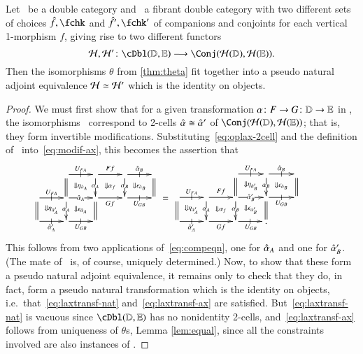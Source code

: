 \documentclass{amsart}
\begin{document}
\begin{lem}\label{thm:h-locfr-uniq}
  Let \lD\ be a double category and \lE\ a fibrant double category
  with two different sets of choices $\fhat,\fchk$ and $\fhat',\fchk'$
  of companions and conjoints for each vertical 1-morphism $f$, giving
  rise to two different functors
  \[\cH,\cH'\maps \cDbl(\lD,\lE)\too \Conj(\cH(\lD),\cH(\lE)).\]
  Then the isomorphisms $\theta$ from \autoref{thm:theta} fit together
  into a pseudo natural adjoint equivalence $\mathcal{H}\simeq \mathcal{H}'$ which is the
  identity on objects.
\end{lem}
\begin{proof}
  We must first show that for a given transformation $\alpha\colon F\to
  G\colon \mathbb{D}\to\mathbb{E}$ in \cDbl, the isomorphisms \th\ correspond to 2-cells $\hat{\alpha} \cong \hat{\alpha}'$ of $\Conj(\cH(\lD),\cH(\lE))$; that is, they form invertible
  modifications.
  Substituting~\eqref{eq:oplax-2cell} and the definition of \th\
  into~\eqref{eq:modif-ax}, this becomes the assertion that
  \begin{equation}
    \vcenter{\xymatrix@R=1.5pc@C=2pc{
        &
        \ar[r]|-@{|}^{U_{FA}}\ar@{=}[d] \ar@{}[dr]|{\Downarrow \eta_{\hat{\alpha}_A}} &
        \ar[r]^{Ff}\ar[d]|{\al_A} \ar@{}[dr]|{\Downarrow \al_f} &
        \ar[r]|-@{|}^{\alhat_B}\ar[d]|{\al_B} \ar@{}[dr]|{\Downarrow \epsilon_{\hat{\alpha}_B}} &
        \ar@{=}[d]\\
        \ar[r]|-@{|}^{U_{FA}} \ar@{=}[d] \ar@{}[dr]|{\Downarrow \eta_{\hat{\alpha}_A'}} &
        \ar[r]|{\alhat_A} \ar[d]|{\al_A} \ar@{}[dr]|{\Downarrow \epsilon_{\hat{\alpha}_A}}&
        \ar[r]_{Gf}  \ar@{=}[d] &
        \ar[r]|-@{|}_{U_{GB}} & \\
        \ar[r]|-@{|}_{\alhat_A'} & \ar[r]|-@{|}_{U_{GB}}&&
      }} \;=\;
    \vcenter{\xymatrix@R=1.5pc@C=2pc{
        && \ar@{=}[d] \ar[r]|-@{|}^{U_{FA}} \ar@{}[dr]|{\Downarrow \eta_{\hat{\alpha}_B'}} &
        \ar[d]|{\al_B} \ar[r]|-@{|}^{\alhat_B} \ar@{}[dr]|{\Downarrow \epsilon_{\hat{\alpha}_B}}
        &
        \ar@{=}[d] &\\
        \ar[r]|-@{|}^{U_{FA}}\ar@{=}[d] \ar@{}[dr]|{\Downarrow \eta_{\hat{\alpha}_A'}} &
        \ar[r]^{Ff}\ar[d]|{\al_A} \ar@{}[dr]|{\Downarrow \al_f} &
        \ar[r]|{\alhat_B'}\ar[d]|{\al_B} \ar@{}[dr]|{\Downarrow \epsilon_{\hat{\alpha}_B'}} &
        \ar@{=}[d] \ar[r]|-@{|}_{U_{GB}}&\\
        \ar[r]|-@{|}_{\alhat_A'} &
        \ar[r]_{Gf} &
        \ar[r]|-@{|}_{U_{GB}} & .
      }}
  \end{equation}
  This follows from two applications of~\eqref{eq:compeqn}, one for
  $\hat{\alpha}_A$ and one for $\hat{\alpha}_B'$.  (The mate of \th\ is, of
  course, uniquely determined.)  Now, to show that these form a pseudo
  natural adjoint equivalence, it remains only to check that they do,
  in fact, form a pseudo natural transformation which is the identity
  on objects, i.e.\ that~\eqref{eq:laxtransf-nat}
  and~\eqref{eq:laxtransf-ax} are satisfied.
  But~\eqref{eq:laxtransf-nat} is vacuous since $\cDbl(\lD,\lE)$ has
  no nonidentity 2-cells, and~\eqref{eq:laxtransf-ax} follows from uniqueness of $\theta$s,
  Lemma \ref{lem:equal}, since all the constraints involved are
  also instances of \th.
\end{proof}
\end{document}
